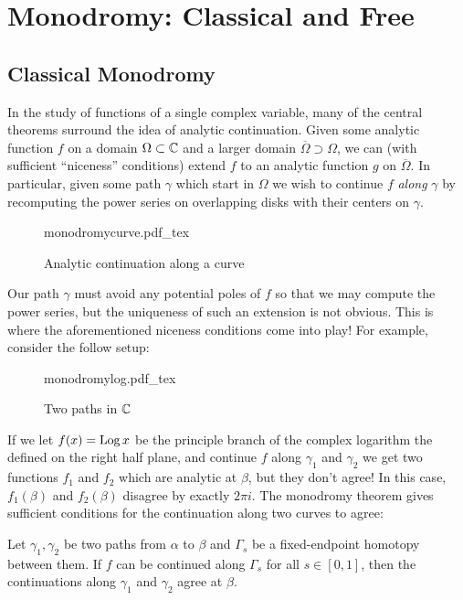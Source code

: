\chapter{Monodromy: Classical and Free}\label{ch:monodromy}
\section{Classical Monodromy}%
\label{sec:classmono}

In the study of functions of a single complex variable, many of the central
theorems surround the idea of analytic continuation. Given some analytic
function \(f\) on a domain \(\Omega \subset\mathbb{C} \) and a larger domain
\(\overline{\Omega} \supset \Omega\), we can (with sufficient
``niceness'' conditions) extend \(f\) to an analytic function \(g\) on
\(\overline{\Omega}\). In particular, given some path \(\gamma\) which start in
\(\Omega\) we wish to continue \(f\) \emph{along} \(\gamma\) by recomputing the
power series on overlapping disks with their centers on \(\gamma\).
\begin{figure}[h!]
\centering
  \def\svgwidth{0.8\columnwidth}
  {monodromycurve.pdf_tex}
\caption{Analytic continuation along a curve}
\label{fig:monocurve}
\end{figure}

Our path \(\gamma\) must avoid any potential poles of \(f\) so that we may
compute the power series, but the uniqueness of such an extension is not
obvious. This is where the aforementioned niceness conditions come into play!
For example, consider the follow setup:

\begin{figure}[h!]
\centering
  \def\svgwidth{0.52\columnwidth}
  {monodromylog.pdf_tex}
\caption{Two paths in \(\mathbb{C} \)}
\label{fig:monolog}
\end{figure}

If we let \(f(x)=\operatorname{Log} x\) be the principle branch of the complex logarithm the
defined on the right half plane, and continue \(f\) along \(\gamma_1\) and
\(\gamma_2\) we get two functions \(f_1\) and \(f_2\) which are analytic at
\(\beta\), but they don't agree! In this case, \(f_1(\beta)\) and \(f_2(\beta)\)
disagree by exactly \(2\pi i\). The monodromy theorem gives sufficient
conditions for the continuation along two curves to agree:

\begin{theorem}[Monodromy I]%
\label{thm:mon1}
  Let \(\gamma_1, \gamma_2\) be two paths from \(\alpha\) to \(\beta\) and
  \(\Gamma_s\) be a fixed-endpoint homotopy between them. If \(f\) can be
  continued along \(\Gamma_s\) for all \(s \in [0,1]\), then the continuations
  along \(\gamma_1\) and \(\gamma_2\) agree at \(\beta\).
\end{theorem}

